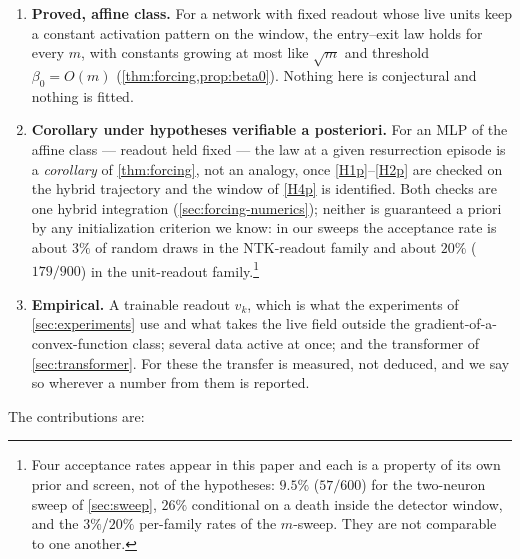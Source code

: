\documentclass[11pt]{article}
\theoremstyle{definition}
\theoremstyle{remark}
\begin{document}
\begin{enumerate}
\item[(P1)] \textbf{Proved, affine class.} For a network with fixed readout
whose live units keep a constant activation pattern on the window, the
entry--exit law holds for every $m$, with constants growing at most like
$\sqrt m$ and threshold $\beta_0=O(m)$ (\cref{thm:forcing,prop:beta0}). Nothing
here is conjectural and nothing is fitted.
\item[(P2)] \textbf{Corollary under hypotheses verifiable a posteriori.} For an
MLP of the affine class --- readout held fixed --- the law at a given
resurrection episode is a \emph{corollary} of \cref{thm:forcing}, not an
analogy, once \eqref{H1p}--\eqref{H2p} are checked on the hybrid trajectory and the
window of \eqref{H4p} is identified. Both checks are one hybrid integration
(\cref{sec:forcing-numerics}); neither is guaranteed a priori by any
initialization criterion we know: in our sweeps the acceptance rate is about
$3\%$ of random draws in the NTK-readout family and about $20\%$ ($179/900$) in
the unit-readout family.\footnote{Four acceptance rates appear in this paper
and each is a property of its own prior and screen, not of the hypotheses:
$9.5\%$ ($57/600$) for the two-neuron sweep of \cref{sec:sweep}, $26\%$
conditional on a death inside the detector window, and the $3\%$/$20\%$
per-family rates of the $m$-sweep. They are not comparable to one another.}
\item[(P3)] \textbf{Empirical.} A trainable readout $v_k$, which is what the
experiments of \cref{sec:experiments} use and what takes the live field outside
the gradient-of-a-convex-function class; several data active at once; and the
transformer of \cref{sec:transformer}. For these the transfer is measured, not
deduced, and we say so wherever a number from them is reported.
\end{enumerate}

The contributions are:
\end{document}
